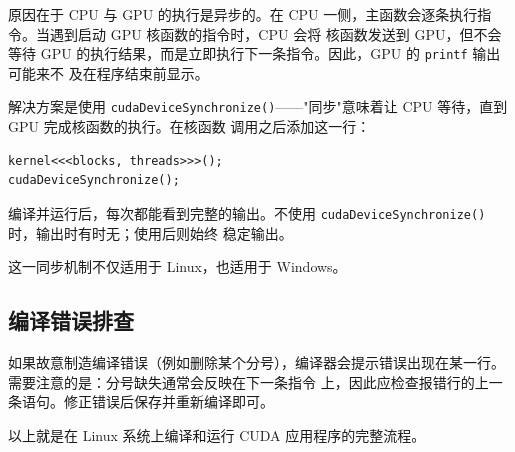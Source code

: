 原因在于 CPU 与 GPU 的执行是异步的。在 CPU 一侧，主函数会逐条执行指令。当遇到启动 GPU 核函数的指令时，CPU 会将
核函数发送到 GPU，但不会等待 GPU 的执行结果，而是立即执行下一条指令。因此，GPU 的 \texttt{printf} 输出可能来不
及在程序结束前显示。

解决方案是使用 \texttt{cudaDeviceSynchronize()}——"同步"意味着让 CPU 等待，直到 GPU 完成核函数的执行。在核函数
调用之后添加这一行：

\begin{verbatim}
kernel<<<blocks, threads>>>();
cudaDeviceSynchronize();
\end{verbatim}

编译并运行后，每次都能看到完整的输出。不使用 \texttt{cudaDeviceSynchronize()} 时，输出时有时无；使用后则始终
稳定输出。

这一同步机制不仅适用于 Linux，也适用于 Windows。

\subsection{编译错误排查}

如果故意制造编译错误（例如删除某个分号），编译器会提示错误出现在某一行。需要注意的是：分号缺失通常会反映在下一条指令
上，因此应检查报错行的上一条语句。修正错误后保存并重新编译即可。

以上就是在 Linux 系统上编译和运行 CUDA 应用程序的完整流程。

